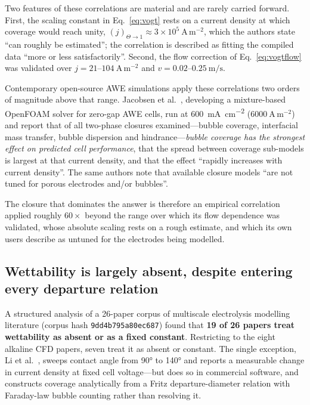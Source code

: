 \documentclass[11pt,a4paper]{article}
\begin{document}
Two features of these correlations are material and are rarely carried forward. First, the scaling
constant in Eq.~\eqref{eq:vogt} rests on a current density at which coverage would reach unity,
$(j)_{\Theta\to1}\approx 3\times10^{5}\ \mathrm{A\,m^{-2}}$, which the authors state ``can roughly
be estimated''; the correlation is described as fitting the compiled data ``more or less
satisfactorily''. Second, the flow correction of Eq.~\eqref{eq:vogtflow} was validated over
$j = 21$--$104\ \mathrm{A\,m^{-2}}$ and $v = 0.02$--$\SI{0.25}{\metre\per\second}$.

Contemporary open-source AWE simulations apply these correlations two orders of magnitude above that
range. Jacobsen et al.~\cite{jacobsen2025}, developing a mixture-based OpenFOAM solver for zero-gap
AWE cells, run at \SI{600}{\milli\ampere\per\square\centi\metre} ($6000\ \mathrm{A\,m^{-2}}$) and
report that of all two-phase closures examined---bubble coverage, interfacial mass transfer, bubble
dispersion and hindrance---\emph{bubble coverage has the strongest effect on predicted cell
performance}, that the spread between coverage sub-models is largest at that current density, and
that the effect ``rapidly increases with current density''. The same authors note that available
closure models ``are not tuned for porous electrodes and/or bubbles''.

The closure that dominates the answer is therefore an empirical correlation applied roughly
$60\times$ beyond the range over which its flow dependence was validated, whose absolute scaling
rests on a rough estimate, and which its own users describe as untuned for the electrodes being
modelled.

\subsection{Wettability is largely absent, despite entering every departure relation}

A structured analysis of a 26-paper corpus of multiscale electrolysis modelling literature (corpus
hash \texttt{9dd4b795a80ec687}) found that \textbf{19 of 26 papers treat wettability as absent or as
a fixed constant}. Restricting to the eight alkaline CFD papers, seven treat it as absent or
constant. The single exception, Li et al.~\cite{li2024}, sweeps contact angle from
\ang{90} to \ang{140} and reports a measurable change in current density at fixed cell voltage---but
does so in commercial software, and constructs coverage analytically from a Fritz departure-diameter
relation with Faraday-law bubble counting rather than resolving it.
\end{document}
